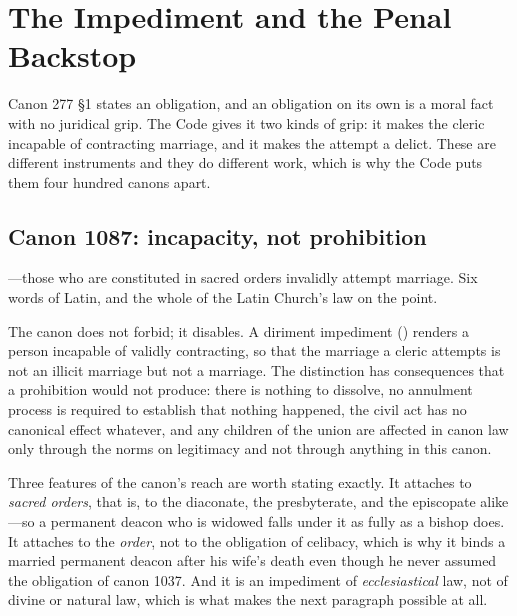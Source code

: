 \section{The Impediment and the Penal Backstop}

Canon 277 §1 states an obligation, and an obligation on its own is a moral fact with no juridical grip. The Code gives it two kinds of grip: it makes the cleric incapable of contracting marriage, and it makes the attempt a delict. These are different instruments and they do different work, which is why the Code puts them four hundred canons apart.

\subsection{Canon 1087: incapacity, not prohibition}

---those who are constituted in sacred orders invalidly attempt marriage. Six words of Latin, and the whole of the Latin Church's law on the point.

The canon does not forbid; it disables. A diriment impediment () renders a person incapable of validly contracting, so that the marriage a cleric attempts is not an illicit marriage but not a marriage. The distinction has consequences that a prohibition would not produce: there is nothing to dissolve, no annulment process is required to establish that nothing happened, the civil act has no canonical effect whatever, and any children of the union are affected in canon law only through the norms on legitimacy and not through anything in this canon.

Three features of the canon's reach are worth stating exactly. It attaches to \emph{sacred orders}, that is, to the diaconate, the presbyterate, and the episcopate alike---so a permanent deacon who is widowed falls under it as fully as a bishop does. It attaches to the \emph{order}, not to the obligation of celibacy, which is why it binds a married permanent deacon after his wife's death even though he never assumed the obligation of canon 1037. And it is an impediment of \emph{ecclesiastical} law, not of divine or natural law, which is what makes the next paragraph possible at all.

